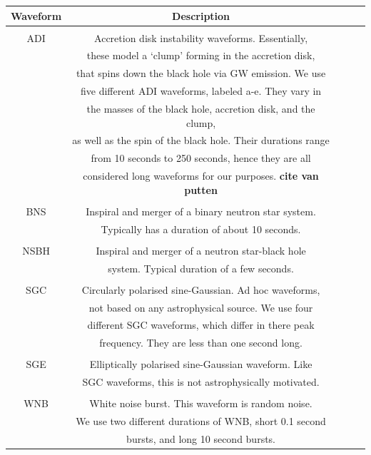 \documentclass[11pt]{cuthesis}
\begin{document}
\begin{table} \label{tab:wfs}
\centering
\begin{tabular}{| c | c | c | c | c |} 
 \hline
\textbf{Waveform }& \textbf{Description}  \\ [0.5ex] 
 \hline\hline
& \\ 
ADI & Accretion disk instability waveforms. Essentially, \\ & these model a `clump' forming in the accretion disk, \\ & that spins down the black hole via GW emission. We use \\ & five different ADI waveforms, labeled a-e. They vary in \\ & the masses of the black hole, accretion disk, and the clump,  \\ & as well as the spin of the black hole. Their durations range \\ & from 10 seconds to 250 seconds, hence they are all \\ & considered long waveforms for our purposes. \textbf{cite van putten}  \\

\hline
& \\
BNS & Inspiral and merger of a binary neutron star system. \\ & Typically has a duration of about 10 seconds.  \\

\hline
& \\
NSBH & Inspiral and merger of a neutron star-black hole \\ & system. Typical duration of a few seconds. \\

\hline
& \\
SGC & Circularly polarised sine-Gaussian. Ad hoc waveforms, \\ & not based on any astrophysical source. We use four \\ & different SGC waveforms, which differ in there peak \\ & frequency. They are less than one second long. \\

\hline
& \\
SGE  & Elliptically polarised sine-Gaussian waveform. Like \\ & SGC waveforms, this is not astrophysically motivated. \\

\hline
& \\
WNB & White noise burst. This waveform is random noise. \\ & We use two different durations of WNB, short 0.1 second \\ & bursts, and long 10 second bursts. \\


\end{tabular}
\end{table}
\end{document}
